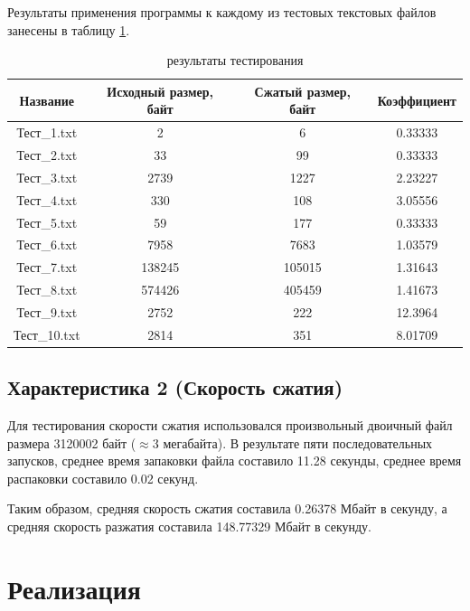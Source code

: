 \documentclass[a4paper,oneside]{article}
\theoremstyle{definition}
\begin{document}
Результаты применения программы к каждому из тестовых текстовых файлов занесены
в таблицу \ref{tbl:results}.

\begin{table}[H]
  \small
  \centering
  \begin{tabular}{|c|c|c|c|}
    \hline
    Название     & Исходный размер, байт & Сжатый размер, байт & Коэффициент \\ \hline \hline
    Тест\_1.txt  & 2           &      6      & 0.33333 \\ \hline
    Тест\_2.txt  & 33          &     99      & 0.33333 \\ \hline
    Тест\_3.txt  & 2739        &   1227      & 2.23227 \\ \hline
    Тест\_4.txt  & 330         &    108      & 3.05556 \\ \hline
    Тест\_5.txt  & 59          &    177      & 0.33333 \\ \hline
    Тест\_6.txt  & 7958        &   7683      & 1.03579 \\ \hline
    Тест\_7.txt  & 138245      & 105015      & 1.31643 \\ \hline
    Тест\_8.txt  & 574426      & 405459      & 1.41673 \\ \hline
    Тест\_9.txt  & 2752        &    222      & 12.3964 \\ \hline
    Тест\_10.txt & 2814        &    351      & 8.01709 \\ \hline
  \end{tabular}
  \caption{результаты тестирования}
  \label{tbl:results}
\end{table}

\subsection{Характеристика 2 (Скорость сжатия)}

Для тестирования скорости сжатия использовался произвольный двоичный
файл размера 3120002 байт ($\approx$3 мегабайта). В результате пяти
последовательных запусков, среднее время запаковки файла составило 11.28
секунды, среднее время распаковки составило 0.02 секунд.

Таким образом, средняя скорость сжатия составила 0.26378 Мбайт в секунду, а
средняя скорость разжатия составила 148.77329 Мбайт в секунду.

\section{Реализация}
\end{document}
